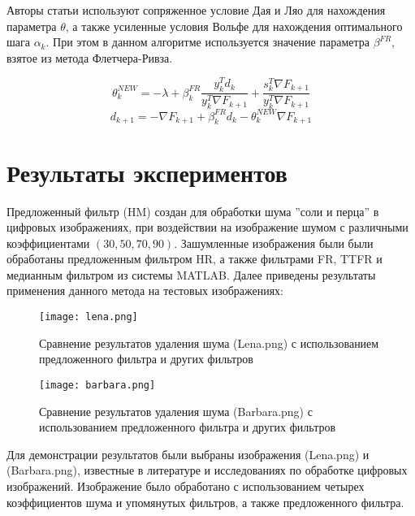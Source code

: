 Авторы статьи используют сопряженное условие Дая и Ляо для нахождения параметра
$\theta$, а также усиленные условия Вольфе для нахождения оптимального шага
$\alpha_{k}$. При этом в данном алгоритме используется значение параметра
$\beta^{FR}$, взятое из метода Флетчера-Ривза.

\begin{equation}\label{eqn:eq7}
    \theta_{k}^{N E W}=-\lambda+\beta_{k}^{F R}\frac{y_{k}^{T}d_{k}}{y_{k}^{T}\nabla F_{k+1}}+\frac{s_{k}^{T}\nabla F_{k+1}}{y_{k}^{T}\nabla F_{k+1}}
\end{equation}
\begin{equation}\label{eqn:eq8}
    d_{k+1}=-\nabla F_{k+1}+\beta_{k}^{F R}d_{k}-\theta_{k}^{N E W} \nabla F_{k+1}
\end{equation}

\section{Результаты экспериментов}

Предложенный фильтр (HM) создан для обработки шума ''соли и перца'' в цифровых
изображениях, при воздействии на изображение шумом с различными коэффициентами
$\left(30,50,70,90\right)$. Зашумленные изображения были были обработаны
предложенным фильтром HR, а также фильтрами FR, TTFR и медианным фильтром из
системы MATLAB. Далее приведены результаты применения данного метода
на тестовых изображениях:

\begin{figure}[ht]
    \centering
    \texttt{[image: lena.png]}
    \caption{Сравнение результатов удаления шума (Lena.png) 
    с использованием предложенного фильтра и других фильтров}
\end{figure}

\begin{figure}[ht]
    \centering
    \texttt{[image: barbara.png]}
    \caption{Сравнение результатов удаления шума (Barbara.png) 
    с использованием предложенного фильтра и других фильтров}
\end{figure}

Для демонстрации результатов были выбраны изображения (Lena.png) и
(Barbara.png), известные в литературе и исследованиях по обработке цифровых
изображений. Изображение было обработано с использованием четырех коэффициентов
шума и упомянутых фильтров, а также предложенного фильтра.


